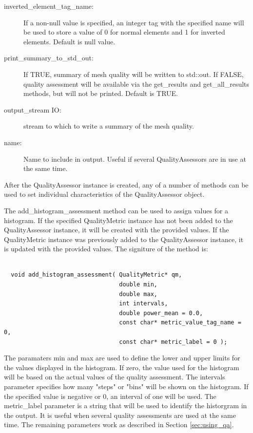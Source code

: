 \begin{description}
\item[inverted\_element\_tag\_name:] If a non-null value is specified, an integer tag with the specified name will be used to store a value of 0 for normal elements and 1 for inverted elements.  Default is null value.

\item[print\_summary\_to\_std\_out:] If TRUE, summary of mesh quality will be written to std::out.  If FALSE, quality assessment will be available via the get\_results and get\_all\_results methods, but will not be printed.	 Default is TRUE.

\item[output\_stream IO:] stream to which to write a summary of the mesh quality.

\item[name:] Name to include in output.	 Useful if several QualityAssessors are in use at the same time.
\end{description}

  After the QualityAssessor instance is created, any of a number of methods can be used to set individual characteristics of the QualityAssessor object.

The add\_histogram\_assessment method can be used to assign values for a histogram.  If the specified QualityMetric instance has not been added to the QualityAssessor instance, it will be created with the provided values.  If the QualityMetric instance was previously added to the QualityAssessor instance, it is updated with the provided values. The signiture of the method is:

\begin{verbatim}

  void add_histogram_assessment( QualityMetric* qm,
                                 double min,
                                 double max,
                                 int intervals,
                                 double power_mean = 0.0,
                                 const char* metric_value_tag_name = 0,
                                 const char* metric_label = 0 );

\end{verbatim}

The paramaters min and max are used to define the lower and upper limits for the values displayed in the histogram.  If zero, the value used for the histogram will be based on the actual values of the quality assessment.  The intervals parameter specifies how many "steps" or "bins" will be shown on the histogram.  If the specified value is negative or 0, an interval of one will be used. The metric\_label parameter is a string that will be used to identify the historgram in the output. It is useful when several quality assessments are used at the same time.  The remaining parameters work as described in Section \ref{sec:using_qa}.


